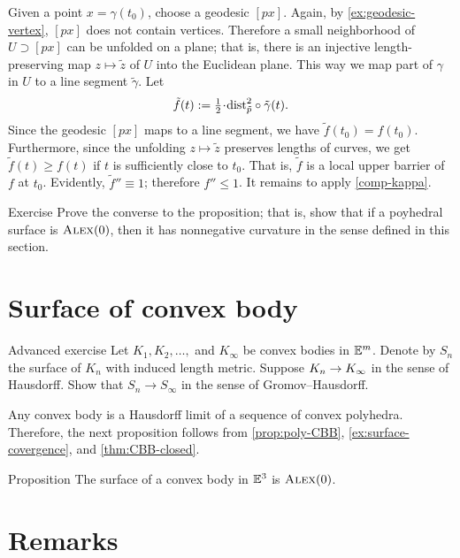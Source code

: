 Given a point $x=\gamma(t_0)$, choose a geodesic $[px]$.
Again, by \ref{ex:geodesic-vertex}, $[px]$ does not contain vertices.
Therefore a small neighborhood of $U\supset [px]$ can be unfolded on a plane;
that is, there is an injective length-preserving map $z\mapsto \tilde z$
of $U$ into the Euclidean plane.
This way we map part of $\gamma$ in $U$ to a line segment $\tilde\gamma$.
Let 
\[\tilde f(t)\df\tfrac12\cdot\distfun_{\tilde p}^2\circ\tilde \gamma(t).\]
Since the geodesic $[px]$ maps to a line segment, we have $\tilde f(t_0)= f(t_0)$.
Furthermore, since the unfolding $z\mapsto \tilde z$ preserves lengths of curves, we get 
$\tilde f(t)\ge f(t)$ if $t$ is sufficiently close to $t_0$.
That is, $\tilde f$ is a local upper barrier of $f$ at $t_0$.
Evidently, $\tilde f''\equiv 1$; therefore $f''\le 1$.
It remains to apply \ref{comp-kappa}.
\qeds

\begin{thm}{Exercise}\label{ex:poly-CBB}
Prove the converse to the proposition;
that is, show that if a poyhedral surface is $\textsc{Alex}(0)$, then it has nonnegative curvature in the sense defined in this section.
\end{thm}

\section{Surface of convex body}

\begin{thm}{Advanced exercise}\label{ex:surface-covergence}
Let $K_1,K_2,\dots,$ and $K_\infty$ be convex bodies in $\mathbb{E}^m$.
Denote by $S_n$ the surface of $K_n$ with induced length metric.
Suppose $K_n\to K_\infty$ in the sense of Hausdorff.
Show that $S_n\to S_\infty$ in the sense of Gromov--Hausdorff.
\end{thm}

Any convex body is a Hausdorff limit of a sequence of convex polyhedra.
Therefore, the next proposition follows from \ref{prop:poly-CBB}, \ref{ex:surface-covergence}, and \ref{thm:CBB-closed}.

\begin{thm}{Proposition}\label{prop:conv-surf-CBB(0)}
The surface of a convex body in $\mathbb{E}^3$ is $\textsc{Alex}(0)$.
\end{thm}


\section{Remarks}

